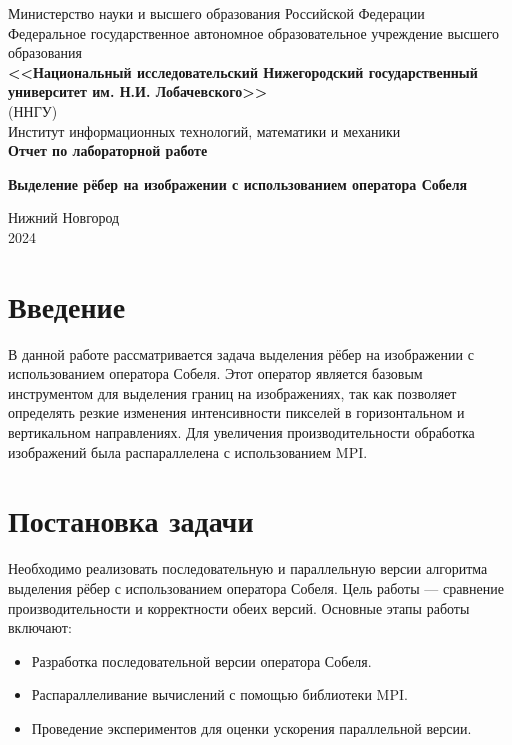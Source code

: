 \documentclass[12pt]{article}
\begin{document}
\begin{titlepage}
\centering
    \large
    Министерство науки и высшего образования Российской Федерации\\[0.5cm]
    Федеральное государственное автономное образовательное учреждение высшего образования\\[0.5cm]
    \textbf{<<Национальный исследовательский Нижегородский государственный университет им. Н.И. Лобачевского>>}\\
    (ННГУ)\\[1cm]
    Институт информационных технологий, математики и механики\\
\vspace*{\fill}
{\Huge \textbf{Отчет по лабораторной работе}}

\vspace{0.5cm}
{\Huge \textbf{Выделение рёбер на изображении с использованием оператора Собеля}}

\vspace*{\fill}

{\large Нижний Новгород\\ 2024}
\end{titlepage}

\newpage
\section*{Введение}
В данной работе рассматривается задача выделения рёбер на изображении с использованием оператора Собеля. Этот оператор является базовым инструментом для выделения границ на изображениях, так как позволяет определять резкие изменения интенсивности пикселей в горизонтальном и вертикальном направлениях. Для увеличения производительности обработка изображений была распараллелена с использованием MPI.

\newpage
\section*{Постановка задачи}
Необходимо реализовать последовательную и параллельную версии алгоритма выделения рёбер с использованием оператора Собеля. Цель работы — сравнение производительности и корректности обеих версий. Основные этапы работы включают:
\begin{itemize}
    \item Разработка последовательной версии оператора Собеля.
    \item Распараллеливание вычислений с помощью библиотеки MPI.
    \item Проведение экспериментов для оценки ускорения параллельной версии.
\end{itemize}
\end{document}
